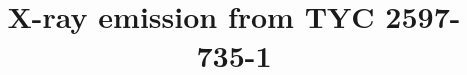 \documentclass[]{aastex631}
\begin{document}
\title{X-ray emission from TYC 2597-735-1}


\end{document}
